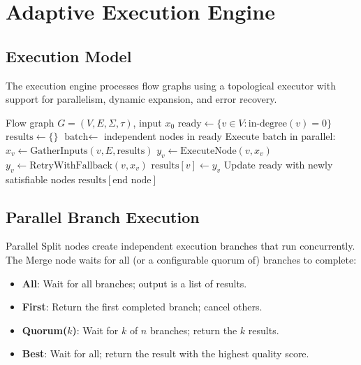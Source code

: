 \section{Adaptive Execution Engine}

\label{sec:engine}

\subsection{Execution Model}

The execution engine processes flow graphs using a topological executor with support for parallelism, dynamic expansion, and error recovery.

\begin{algorithm}[H]
\caption{Adaptive Flow Execution}
\label{alg:execute}
\begin{algorithmic}[1]
\Require Flow graph $G = (V, E, \Sigma, \tau)$, input $x_0$
\State $\text{ready} \gets \{v \in V : \text{in-degree}(v) = 0\}$
\State $\text{results} \gets \{\}$
    \State $\text{batch} \gets$ independent nodes in $\text{ready}$
    \State Execute $\text{batch}$ in parallel:
        \State $x_v \gets \text{GatherInputs}(v, E, \text{results})$
        \State $y_v \gets \text{ExecuteNode}(v, x_v)$
            \State $y_v \gets \text{RetryWithFallback}(v, x_v)$
        \EndIf
        \State $\text{results}[v] \gets y_v$
    \EndFor
    \State Update $\text{ready}$ with newly satisfiable nodes
\EndWhile
\State \Return $\text{results}[\text{end node}]$
\end{algorithmic}
\end{algorithm}

\subsection{Parallel Branch Execution}

Parallel Split nodes create independent execution branches that run concurrently. The Merge node waits for all (or a configurable quorum of) branches to complete:

\begin{definition}
\begin{itemize}[leftmargin=1.1em]
    \item \textbf{All}: Wait for all branches; output is a list of results.
    \item \textbf{First}: Return the first completed branch; cancel others.
    \item \textbf{Quorum($k$)}: Wait for $k$ of $n$ branches; return the $k$ results.
    \item \textbf{Best}: Wait for all; return the result with the highest quality score.
\end{itemize}
\end{definition}

